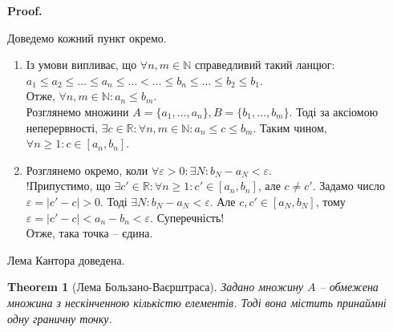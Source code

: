 \documentclass[a4paper, 14pt]{article}
\makeatletter
\def\qed{$\blacksquare$}
\theoremstyle{theoremdd}
\newtheorem{theorem}{Theorem}[subsection]
\theoremstyle{theoremdd}
\theoremstyle{theoremdd}
\theoremstyle{theoremdd}
\theoremstyle{theoremdd}
\theoremstyle{theoremdd}
\theoremstyle{theoremdd}
\theoremstyle{theoremdd}
\renewenvironment{proof}[1][Proof.\\]{\par
\pushQED{\hfill \qed}%
\normalfont \topsep6\p@\@plus6\p@\relax
\trivlist
\item\relax
{\bfseries
#1\@addpunct{.}}\hspace\labelsep\ignorespaces
}{%
\popQED\endtrivlist\@endpefalse
}
\makeatother
\begin{document}
	\begin{proof}
	Доведемо кожний пункт окремо.
	\begin{enumerate}[wide=0pt,label={\arabic*)}]
	\item Із умови випливає, що $\forall n,m \in \mathbb{N}$ справедливий такий ланцюг:\\
	$a_1 \leq a_2 \leq \dots \leq a_n \leq \dots < \dots \leq b_n \leq \dots \leq b_2 \leq b_1$.\\
	Отже, $\forall n,m \in \mathbb{N}: a_n \leq b_m$.\\
	Розглянемо множини $A = \{a_1,\dots,a_n\}, B = \{b_1, \dots, b_m\}$.
	Тоді за аксіомою неперервності, $\exists c \in \mathbb{R}: \forall n,m \in \mathbb{N}: a_n \leq c \leq b_m$. Таким чином, $\forall n \geq 1: c \in [a_n,b_n]$.
	\item Розглянемо окремо, коли $\forall \varepsilon > 0: \exists N: b_N - a_N < \varepsilon$.\\
	!Припустимо, що $\exists c' \in \mathbb{R}: \forall n \geq 1: c' \in [a_n,b_n]$, але $c \neq c'$. Задамо число $\varepsilon = |c' - c| > 0$. Тоді $\exists N: b_N - a_N < \varepsilon$. Але $c,c' \in [a_N,b_N]$, тому $\varepsilon = |c'-c| < a_n-b_n < \varepsilon$. Суперечність!\\
	Отже, така точка -- єдина.
	\end{enumerate}
	Лема Кантора доведена.
	\end{proof}
	
	\begin{theorem}[Лема Бользано-Ваєрштраса]
	Задано множину $A$ -- обмежена множина з нескінченною кількістю елементів. Тоді вона містить принаймні одну граничну точку.
	\end{theorem}
	
\end{document}
